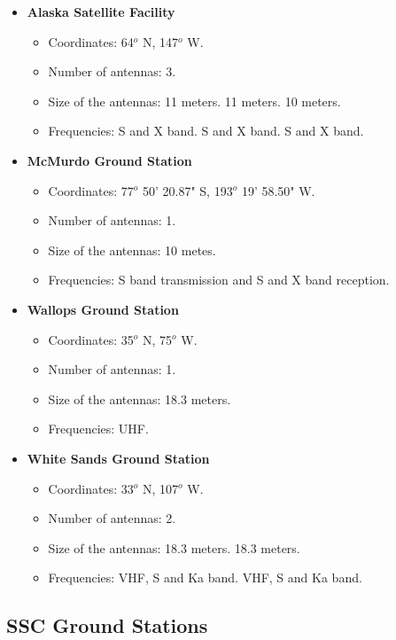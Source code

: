 \documentclass[12pt,a4paper]{report}
\begin{document}
\begin{itemize}
\item \textbf{Alaska Satellite Facility}
\begin{itemize}
\item Coordinates: 64$^{o}$ N, 147$^{o}$ W.
\item Number of antennas: 3.
\item Size of the antennas: 11 meters. 11 meters. 10 meters.
\item Frequencies: S and X band. S and X band. S and X band.
\end{itemize}
\item \textbf{McMurdo Ground Station}
\begin{itemize}
\item Coordinates: 77$^{o}$ 50' 20.87" S, 193$^{o}$ 19' 58.50" W.
\item Number of antennas: 1.
\item Size of the antennas: 10 metes.
\item Frequencies: S band transmission and S and X band reception.
\end{itemize}
\item \textbf{Wallops Ground Station}
\begin{itemize}
\item Coordinates: 35$^{o}$ N, 75$^{o}$ W.
\item Number of antennas: 1.
\item Size of the antennas: 18.3 meters.
\item Frequencies: UHF.
\end{itemize}
\item \textbf{White Sands Ground Station}
\begin{itemize}
\item Coordinates: 33$^{o}$ N, 107$^{o}$ W.
\item Number of antennas: 2.
\item Size of the antennas: 18.3 meters. 18.3 meters.
\item Frequencies: VHF, S and Ka band. VHF, S and Ka band.
\end{itemize}
\end{itemize}

\subsection{SSC Ground Stations}
\end{document}
